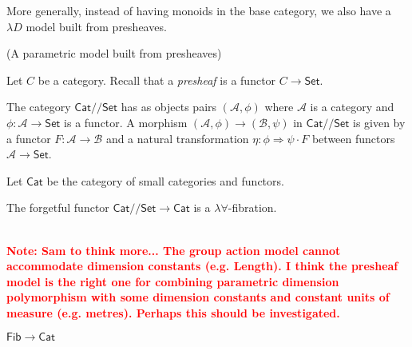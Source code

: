 \documentclass[a4paper,UKenglish]{lipics}
\newcommand\note[1]{{ \bf \textcolor{red} {\vspace{2mm}\; \\ Note: #1\\}}}
\newcommand{\ra}{\rightarrow}
\newcommand{\msf}[1]{\mathsf{#1}} %
\newcommand{\Set}{\msf{Set}}
\newcommand{\Cat}{\msf{Cat}}
\newcommand{\Fib}{\msf{Fib}}
\newcommand{\LAb}{\msf{L}_{\msf{Ab}}}
\newcommand{\terminal}{\msf{1}}
\newcommand{\A}{\mathcal{A}}
\newcommand{\B}{\mathcal{B}}
\newcommand{\E}{\mathcal{E}}
\newcommand{\fibreE}[1]{\E_{_{#1}}}
\newcommand{\GroupSet}[1]{#1/\!/\Set}
\newcommand{\CatSet}{\GroupSet{\Cat}}
\newcommand{\qnt}{\msf{quantity}}
\begin{document}
More generally, instead of having monoids in the base category, we also have a $\lambda D$ model built from presheaves. 

\begin{example}(A parametric model built from presheaves)
\label{ex:presheaves}

Let $C$ be a category. Recall that a \emph{presheaf} is a
functor $C\to\Set$.

The category $\CatSet$ has as objects pairs $(\A,\phi)$ where $\A$ is a category and $\phi:\A\to\Set$ is a functor. A morphism $(\A,\phi) \rightarrow (\B,\psi)$ in $\CatSet$ is given by a functor $F:\A\rightarrow \B$ and a natural transformation $\eta:\phi \Rightarrow \psi \cdot F$ between functors $\A \to\Set$.


Let $\Cat$ be the category of small categories and functors.

The forgetful functor $\CatSet\to \Cat$ is a $\lambda\forall$-fibration.


\note{Sam to think more... The group action model cannot accommodate dimension constants (e.g. Length). I think the presheaf model is the right one for combining parametric dimension polymorphism with
some dimension constants and constant units of measure (e.g. metres).
Perhaps this should be investigated.}

\end{example}

\begin{example}\label{ex:fibrations}
$\Fib \rightarrow \Cat$
\end{example}



\end{document}
